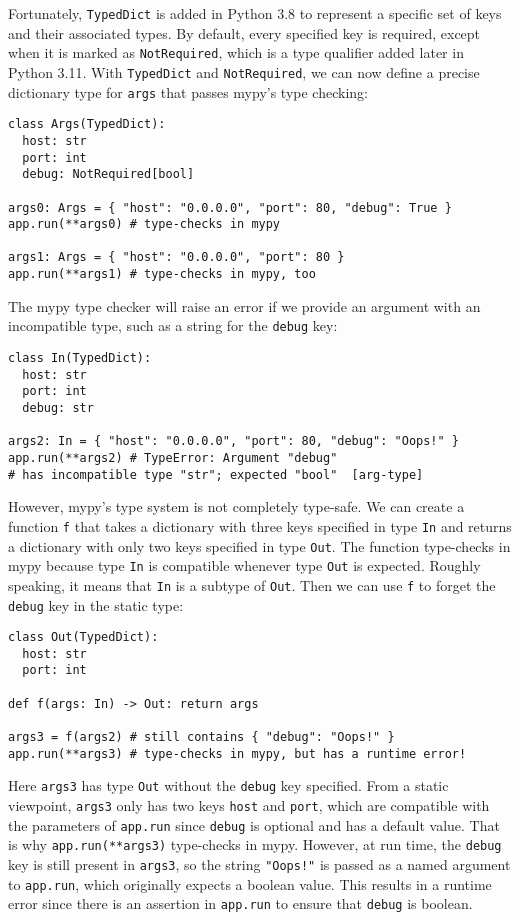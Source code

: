 Fortunately, \lstinline{TypedDict} is added in Python 3.8 to represent a
specific set of keys and their associated types. By default, every specified key
is required, except when it is marked as \lstinline{NotRequired}, which is a
type qualifier added later in Python 3.11. With \lstinline{TypedDict} and
\lstinline{NotRequired}, we can now define a precise dictionary type for
\lstinline{args} that passes mypy's type checking:
\begin{lstlisting}[language={[3]Python}]
class Args(TypedDict):
  host: str
  port: int
  debug: NotRequired[bool]

args0: Args = { "host": "0.0.0.0", "port": 80, "debug": True }
app.run(**args0) # type-checks in mypy

args1: Args = { "host": "0.0.0.0", "port": 80 }
app.run(**args1) # type-checks in mypy, too
\end{lstlisting}
The mypy type checker will raise an error if we provide an argument with an
incompatible type, such as a string for the \lstinline{debug} key:
\begin{lstlisting}[language={[3]Python}]
class In(TypedDict):
  host: str
  port: int
  debug: str

args2: In = { "host": "0.0.0.0", "port": 80, "debug": "Oops!" }
app.run(**args2) # TypeError: Argument "debug"
# has incompatible type "str"; expected "bool"  [arg-type]
\end{lstlisting}
However, mypy's type system is not completely type-safe. We can create a
function \lstinline{f} that takes a dictionary with three keys specified in type
\lstinline{In} and returns a dictionary with only two keys specified in type
\lstinline{Out}. The function type-checks in mypy because type \lstinline{In} is
compatible whenever type \lstinline{Out} is expected. Roughly speaking, it means
that \lstinline{In} is a subtype of \lstinline{Out}. Then we can use
\lstinline{f} to forget the \lstinline{debug} key in the static type:
\begin{lstlisting}[language={[3]Python}]
class Out(TypedDict):
  host: str
  port: int

def f(args: In) -> Out: return args

args3 = f(args2) # still contains { "debug": "Oops!" }
app.run(**args3) # type-checks in mypy, but has a runtime error!
\end{lstlisting}
Here \lstinline{args3} has type \lstinline{Out} without the \lstinline{debug}
key specified. From a static viewpoint, \lstinline{args3} only has two keys
\lstinline{host} and \lstinline{port}, which are compatible with the parameters
of \lstinline{app.run} since \lstinline{debug} is optional and has a default
value. That is why \lstinline{app.run(**args3)} type-checks in mypy. However, at
run time, the \lstinline{debug} key is still present in \lstinline{args3}, so
the string \lstinline{"Oops!"} is passed as a named argument to
\lstinline{app.run}, which originally expects a boolean value. This results in a
runtime error since there is an assertion in \lstinline{app.run} to ensure that
\lstinline{debug} is boolean.


